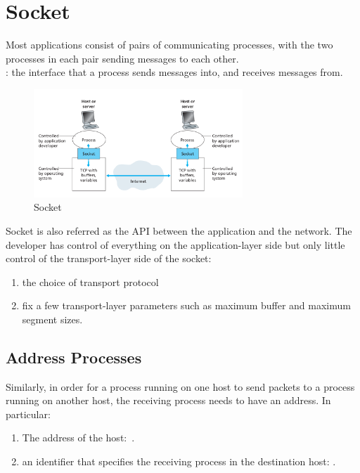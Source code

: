 \section{Socket}

Most applications consist of pairs of communicating processes, with the two processes in each pair sending messages to each other.\\
: the interface that a process sends messages into, and receives messages from.

\begin{figure}[!h]
    \centering
    \includegraphics[width=0.7\textwidth]{chapters/chapter2/socket.png}
    \caption{Socket}
    \label{c2_socket}
\end{figure}

Socket is also referred as the API between the application and the network. The developer has control
of everything on the application-layer side but only little control of the transport-layer side of the socket:
\begin{enumerate}
    \item the choice of transport protocol
    \item fix a few transport-layer parameters such as maximum buffer and maximum segment sizes.
\end{enumerate}

\subsection{Address Processes}

Similarly, in order for a process running on one host to send packets to a
process running on another host, the receiving process needs to have an address.
In particular:
\begin{enumerate}
    \item The address of the host:\ .
    \item an identifier that specifies the receiving process in the destination host: .
\end{enumerate}

